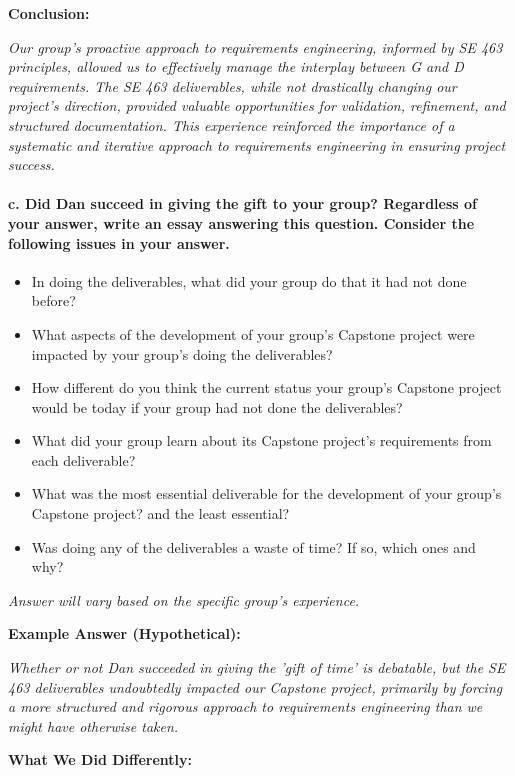 \documentclass{article}
\begin{document}
\textbf{Conclusion:}

\textit{Our group's proactive approach to requirements engineering, informed by SE 463 principles, allowed us to effectively manage the interplay between G and D requirements. The SE 463 deliverables, while not drastically changing our project's direction, provided valuable opportunities for validation, refinement, and structured documentation. This experience reinforced the importance of a systematic and iterative approach to requirements engineering in ensuring project success.}

\paragraph{c. Did Dan succeed in giving the gift to your group? Regardless of your answer, write an essay answering this question. Consider the following issues in your answer.}
\begin{itemize}
    \item In doing the deliverables, what did your group do that it had not done before?
    \item What aspects of the development of your group's Capstone project were impacted by your group's doing the deliverables?
    \item How different do you think the current status your group's Capstone project would be today if your group had not done the deliverables?
    \item What did your group learn about its Capstone project's requirements from each deliverable?
    \item What was the most essential deliverable for the development of your group's Capstone project? and the least essential?
    \item Was doing any of the deliverables a waste of time? If so, which ones and why?
\end{itemize}

\textit{Answer will vary based on the specific group's experience.}

\textbf{Example Answer (Hypothetical):}

\textit{Whether or not Dan succeeded in giving the 'gift of time' is debatable, but the SE 463 deliverables undoubtedly impacted our Capstone project, primarily by forcing a more structured and rigorous approach to requirements engineering than we might have otherwise taken.}

\textbf{What We Did Differently:}
\end{document}
